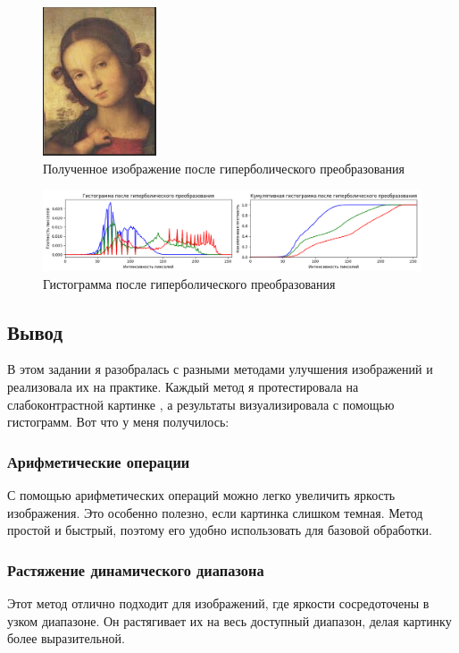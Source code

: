 \documentclass[a4paper,12pt]{article}
\begin{document}
\begin{figure}[H]
    \centering
    \includegraphics[width=0.3\textwidth]{im/imГиперболическое.png}
    \caption{Полученное изображение после гиперболического преобразования}
    \label{fig:hyperbolic_image}
\end{figure}

\begin{figure}[H]
    \centering
        \includegraphics[width=1\textwidth]{im/гистограммаГиперболическое.png}
    \caption{Гистограмма после гиперболического преобразования}
    \label{fig:hyperbolic_histogram}
\end{figure}


\subsection{Вывод}

В этом задании я разобралась с разными методами улучшения изображений и реализовала их на практике. Каждый метод я протестировала на слабоконтрастной картинке , а результаты визуализировала с помощью гистограмм. Вот что у меня получилось:

\subsubsection{Арифметические операции}
С помощью арифметических операций можно легко увеличить яркость изображения. Это особенно полезно, если картинка слишком темная. Метод простой и быстрый, поэтому его удобно использовать для базовой обработки.

\subsubsection{Растяжение динамического диапазона}
Этот метод отлично подходит для изображений, где яркости сосредоточены в узком диапазоне. Он растягивает их на весь доступный диапазон, делая картинку более выразительной. 
\end{document}
